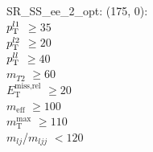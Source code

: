 SR\_SS\_ee\_2\_opt: (175, 0): \\
$p_{\text{T}}^{l1}$ $\geq 35$ \\
$p_{\text{T}}^{l2}$ $\geq 20$ \\
$p_{\text{T}}^{ll}$ $\geq 40$ \\
$m_{T2}$ $\geq 60$ \\
$E_{\text{T}}^{\text{miss,rel}}$ $\geq 20$ \\
$m_{\text{eff}}$ $\geq 100$ \\
$m_{\text{T}}^{\text{max}}$ $\geq 110$ \\
$m_{lj}$/$m_{ljj}$ $<120$ \\
